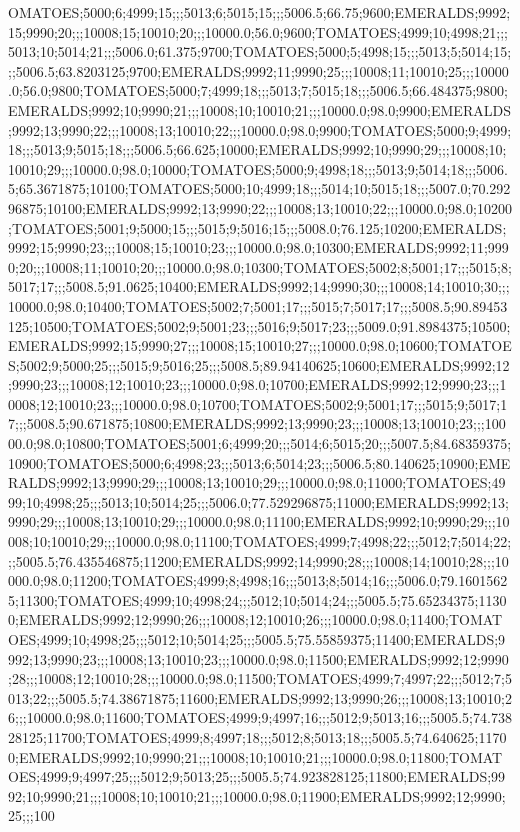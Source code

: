 OMATOES;5000;6;4999;15;;;5013;6;5015;15;;;5006.5;66.75;9600;EMERALDS;9992;15;9990;20;;;10008;15;10010;20;;;10000.0;56.0;9600;TOMATOES;4999;10;4998;21;;;5013;10;5014;21;;;5006.0;61.375;9700;TOMATOES;5000;5;4998;15;;;5013;5;5014;15;;;5006.5;63.8203125;9700;EMERALDS;9992;11;9990;25;;;10008;11;10010;25;;;10000.0;56.0;9800;TOMATOES;5000;7;4999;18;;;5013;7;5015;18;;;5006.5;66.484375;9800;EMERALDS;9992;10;9990;21;;;10008;10;10010;21;;;10000.0;98.0;9900;EMERALDS;9992;13;9990;22;;;10008;13;10010;22;;;10000.0;98.0;9900;TOMATOES;5000;9;4999;18;;;5013;9;5015;18;;;5006.5;66.625;10000;EMERALDS;9992;10;9990;29;;;10008;10;10010;29;;;10000.0;98.0;10000;TOMATOES;5000;9;4998;18;;;5013;9;5014;18;;;5006.5;65.3671875;10100;TOMATOES;5000;10;4999;18;;;5014;10;5015;18;;;5007.0;70.29296875;10100;EMERALDS;9992;13;9990;22;;;10008;13;10010;22;;;10000.0;98.0;10200;TOMATOES;5001;9;5000;15;;;5015;9;5016;15;;;5008.0;76.125;10200;EMERALDS;9992;15;9990;23;;;10008;15;10010;23;;;10000.0;98.0;10300;EMERALDS;9992;11;9990;20;;;10008;11;10010;20;;;10000.0;98.0;10300;TOMATOES;5002;8;5001;17;;;5015;8;5017;17;;;5008.5;91.0625;10400;EMERALDS;9992;14;9990;30;;;10008;14;10010;30;;;10000.0;98.0;10400;TOMATOES;5002;7;5001;17;;;5015;7;5017;17;;;5008.5;90.89453125;10500;TOMATOES;5002;9;5001;23;;;5016;9;5017;23;;;5009.0;91.8984375;10500;EMERALDS;9992;15;9990;27;;;10008;15;10010;27;;;10000.0;98.0;10600;TOMATOES;5002;9;5000;25;;;5015;9;5016;25;;;5008.5;89.94140625;10600;EMERALDS;9992;12;9990;23;;;10008;12;10010;23;;;10000.0;98.0;10700;EMERALDS;9992;12;9990;23;;;10008;12;10010;23;;;10000.0;98.0;10700;TOMATOES;5002;9;5001;17;;;5015;9;5017;17;;;5008.5;90.671875;10800;EMERALDS;9992;13;9990;23;;;10008;13;10010;23;;;10000.0;98.0;10800;TOMATOES;5001;6;4999;20;;;5014;6;5015;20;;;5007.5;84.68359375;10900;TOMATOES;5000;6;4998;23;;;5013;6;5014;23;;;5006.5;80.140625;10900;EMERALDS;9992;13;9990;29;;;10008;13;10010;29;;;10000.0;98.0;11000;TOMATOES;4999;10;4998;25;;;5013;10;5014;25;;;5006.0;77.529296875;11000;EMERALDS;9992;13;9990;29;;;10008;13;10010;29;;;10000.0;98.0;11100;EMERALDS;9992;10;9990;29;;;10008;10;10010;29;;;10000.0;98.0;11100;TOMATOES;4999;7;4998;22;;;5012;7;5014;22;;;5005.5;76.435546875;11200;EMERALDS;9992;14;9990;28;;;10008;14;10010;28;;;10000.0;98.0;11200;TOMATOES;4999;8;4998;16;;;5013;8;5014;16;;;5006.0;79.16015625;11300;TOMATOES;4999;10;4998;24;;;5012;10;5014;24;;;5005.5;75.65234375;11300;EMERALDS;9992;12;9990;26;;;10008;12;10010;26;;;10000.0;98.0;11400;TOMATOES;4999;10;4998;25;;;5012;10;5014;25;;;5005.5;75.55859375;11400;EMERALDS;9992;13;9990;23;;;10008;13;10010;23;;;10000.0;98.0;11500;EMERALDS;9992;12;9990;28;;;10008;12;10010;28;;;10000.0;98.0;11500;TOMATOES;4999;7;4997;22;;;5012;7;5013;22;;;5005.5;74.38671875;11600;EMERALDS;9992;13;9990;26;;;10008;13;10010;26;;;10000.0;98.0;11600;TOMATOES;4999;9;4997;16;;;5012;9;5013;16;;;5005.5;74.73828125;11700;TOMATOES;4999;8;4997;18;;;5012;8;5013;18;;;5005.5;74.640625;11700;EMERALDS;9992;10;9990;21;;;10008;10;10010;21;;;10000.0;98.0;11800;TOMATOES;4999;9;4997;25;;;5012;9;5013;25;;;5005.5;74.923828125;11800;EMERALDS;9992;10;9990;21;;;10008;10;10010;21;;;10000.0;98.0;11900;EMERALDS;9992;12;9990;25;;;100